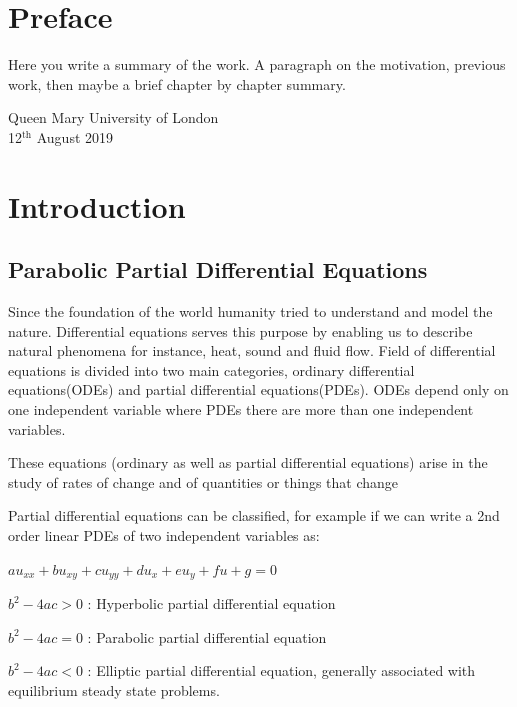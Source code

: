\documentclass[12pt, oneside]{book}
\theoremstyle{plain}
\theoremstyle{definition}
\begin{document}
\chapter*{Preface}
Here  you write a summary of the work. A paragraph on the motivation, previous work, then maybe a brief chapter by chapter summary. 

\lipsum[100]%



\begin{flushright}
Queen Mary University of London\\
12${}^{\text{th}}$ August 2019
\end{flushright}


\tableofcontents

\chapter{Introduction}

\section{Parabolic Partial Differential Equations}\label{Parabolic Partial Differential Equations}
Since the foundation of the world humanity tried to understand and model the nature. Differential equations serves this purpose by enabling us to describe natural phenomena for instance, heat, sound and fluid flow. Field of differential equations is divided into two main categories, ordinary differential equations(ODEs) and partial differential equations(PDEs). ODEs depend only on one independent variable where PDEs there are more than one independent variables. 


These equations (ordinary as well as partial differential equations) arise in the study of rates of change and of quantities or things that change

Partial differential equations can be classified, for example if we can write a 2nd order linear PDEs of two independent variables as:

$ au_{xx} + bu_{xy} + cu_{yy} + du_x + eu_y + fu + g = 0 $

$ b^2 - 4ac > 0 $ : Hyperbolic partial differential equation

$ b^2 - 4ac = 0 $ : Parabolic partial differential equation

$ b^2 - 4ac < 0 $ : Elliptic partial differential equation, generally associated with equilibrium steady state problems.
\end{document}
